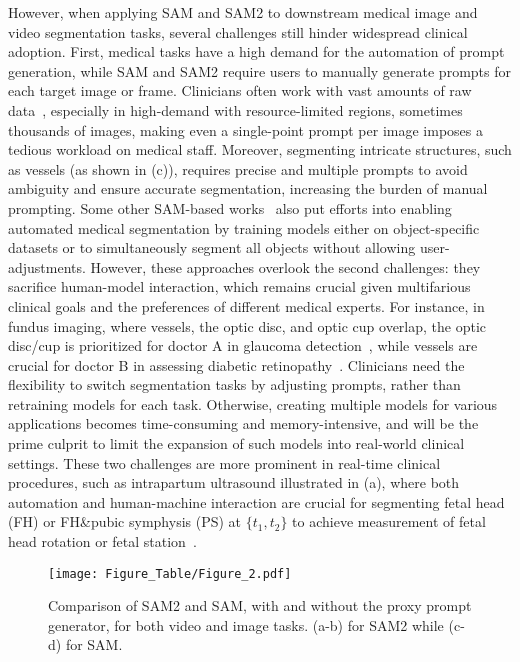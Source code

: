 However, when applying SAM and SAM2 to downstream medical image and video segmentation tasks, several challenges still hinder widespread clinical adoption. First, medical tasks have a high demand for the automation of prompt generation, while SAM and SAM2 require users to manually generate prompts for each target image or frame. Clinicians often work with vast amounts of raw data~\cite{azad2024medical}, especially in high-demand with resource-limited regions, sometimes thousands of images, making even a single-point prompt per image imposes a tedious workload on medical staff. Moreover, segmenting intricate structures, such as vessels (as shown in (c)), requires precise and multiple prompts to avoid ambiguity and ensure accurate segmentation, increasing the burden of manual prompting. Some other SAM-based works~\cite{shaharabany2023autosam, zhang2023customized, wu2023self} also put efforts into enabling automated medical segmentation by training models either on object-specific datasets or to simultaneously segment all objects without allowing user-adjustments. However, these approaches overlook the second challenges: they sacrifice human-model interaction, which remains crucial given multifarious clinical goals and the preferences of different medical experts. For instance, in fundus imaging, where vessels, the optic disc, and optic cup overlap, the optic disc/cup is prioritized for doctor A in glaucoma detection~\cite{thakur2018survey}, while vessels are crucial for doctor B in assessing diabetic retinopathy~\cite{sekhar2008automated}. Clinicians need the flexibility to switch segmentation tasks by adjusting prompts, rather than retraining models for each task. Otherwise, creating multiple models for various applications becomes time-consuming and memory-intensive, and will be the prime culprit to limit the expansion of such models into real-world clinical settings. These two challenges are more prominent in real-time clinical procedures, such as intrapartum ultrasound illustrated in (a), where both automation and human-machine interaction are crucial for segmenting fetal head (FH) or FH\&pubic symphysis (PS) at \(\{t_{1}, t_{2}\}\) to achieve measurement of fetal head rotation or fetal station~\cite{ghi2018isuog}.

\begin{figure}
  \centering
   \texttt{[image: Figure\_Table/Figure\_2.pdf]}
   \caption{Comparison of SAM2 and SAM, with and without the proxy prompt generator, for both video and image tasks. (a-b) for SAM2 while (c-d) for SAM.}
   \label{fig:Figure2}
\end{figure}

